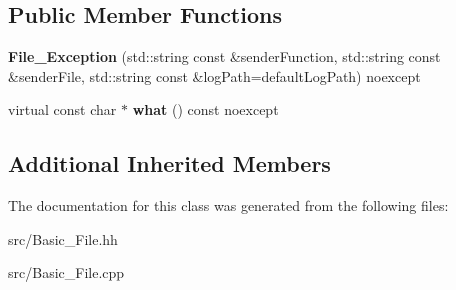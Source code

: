 \subsection*{Public Member Functions}
\begin{DoxyCompactItemize}
\item 
\hypertarget{classstb_1_1File__Exception_ad2e0c9b94edd1d903fafba2e787e4894}{{\bfseries File\+\_\+\+Exception} (std\+::string const \&sender\+Function, std\+::string const \&sender\+File, std\+::string const \&log\+Path=default\+Log\+Path) noexcept}\label{classstb_1_1File__Exception_ad2e0c9b94edd1d903fafba2e787e4894}

\item 
\hypertarget{classstb_1_1File__Exception_ade6c9b061b4c331a802eceb7f589b7dc}{virtual const char $\ast$ {\bfseries what} () const noexcept}\label{classstb_1_1File__Exception_ade6c9b061b4c331a802eceb7f589b7dc}

\end{DoxyCompactItemize}
\subsection*{Additional Inherited Members}


The documentation for this class was generated from the following files\+:\begin{DoxyCompactItemize}
\item 
src/Basic\+\_\+\+File.\+hh\item 
src/Basic\+\_\+\+File.\+cpp\end{DoxyCompactItemize}
